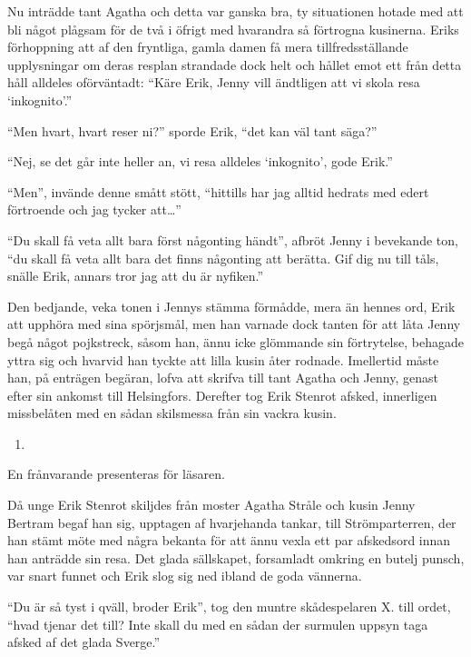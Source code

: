 Nu inträdde tant Agatha och detta var ganska bra, ty situationen hotade
med att bli något plågsam för de två i öfrigt med hvarandra så förtrogna
kusinerna. Eriks förhoppning att af den fryntliga, gamla damen få mera
tillfredsställande upplysningar om deras resplan strandade dock helt och
hållet emot ett från detta håll alldeles oförväntadt: ``Käre Erik, Jenny
vill ändtligen att vi skola resa `inkognito'.''

``Men hvart, hvart reser ni?'' sporde Erik, ``det kan väl tant säga?''

``Nej, se det går inte heller an, vi resa alldeles `inkognito', gode
Erik.''

``Men'', invände denne smått stött, ``hittills har jag alltid hedrats
med edert förtroende och jag tycker att\ldots{}''

``Du skall få veta allt bara först någonting händt'', afbröt Jenny i
bevekande ton, ``du skall få veta allt bara det finns någonting att
berätta. Gif dig nu till tåls, snälle Erik, annars tror jag att du är
nyfiken.''

Den bedjande, veka tonen i Jennys stämma förmådde, mera än hennes ord,
Erik att upphöra med sina spörjsmål, men han varnade dock tanten för att
låta Jenny begå något pojkstreck, såsom han, ännu icke glömmande sin
förtrytelse, behagade yttra sig och hvarvid han tyckte att lilla kusin
åter rodnade. Imellertid måste han, på enträgen begäran, lofva att
skrifva till tant Agatha och Jenny, genast efter sin ankomst till
Helsingfors. Derefter tog Erik Stenrot afsked, innerligen missbelåten
med en sådan skilsmessa från sin vackra kusin.

\begin{enumerate}
\def\labelenumi{\arabic{enumi}.}
\setcounter{enumi}{1}
\tightlist
\item
\end{enumerate}

En frånvarande presenteras för läsaren.

Då unge Erik Stenrot skiljdes från moster Agatha Stråle och kusin Jenny
Bertram begaf han sig, upptagen af hvarjehanda tankar, till
Strömparterren, der han stämt möte med några bekanta för att ännu vexla
ett par afskedsord innan han anträdde sin resa. Det glada sällskapet,
forsamladt omkring en butelj punsch, var snart funnet och Erik slog sig
ned ibland de goda vännerna.

``Du är så tyst i qväll, broder Erik'', tog den muntre skådespelaren X.
till ordet, ``hvad tjenar det till? Inte skall du med en sådan der
surmulen uppsyn taga afsked af det glada Sverge.''

